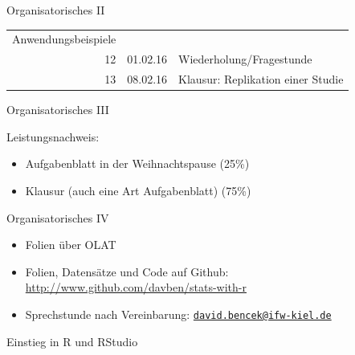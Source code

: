 \documentclass[ignorenonframetext,]{beamer}
\begin{document}
\begin{frame}{Organisatorisches II}
\begin{longtable}[c]{@{}rll@{}}
\begin{minipage}[t]{0.58\columnwidth}\raggedright\strut
Anwendungsbeispiele
\strut\end{minipage}\tabularnewline
\begin{minipage}[t]{0.17\columnwidth}\raggedleft\strut
12
\strut\end{minipage} &
\begin{minipage}[t]{0.17\columnwidth}\raggedright\strut
01.02.16
\strut\end{minipage} &
\begin{minipage}[t]{0.58\columnwidth}\raggedright\strut
Wiederholung/Fragestunde
\strut\end{minipage}\tabularnewline
\begin{minipage}[t]{0.17\columnwidth}\raggedleft\strut
13
\strut\end{minipage} &
\begin{minipage}[t]{0.17\columnwidth}\raggedright\strut
08.02.16
\strut\end{minipage} &
\begin{minipage}[t]{0.58\columnwidth}\raggedright\strut
Klausur: Replikation einer Studie
\strut\end{minipage}\tabularnewline
\bottomrule
\end{longtable}

\end{frame}

\begin{frame}{Organisatorisches III}

\begin{block}{Leistungsnachweis:}

\begin{itemize}
\itemsep1pt\parskip0pt
\item
  Aufgabenblatt in der Weihnachtspause (25\%)
\item
  Klausur (auch eine Art Aufgabenblatt) (75\%)
\end{itemize}

\end{block}

\end{frame}

\begin{frame}{Organisatorisches IV}

\begin{itemize}
\item
  Folien über OLAT
\item
  Folien, Datensätze und Code auf Github:
  \href{http://www.github.com/davben/stats-with-r}{\url{http://www.github.com/davben/stats-with-r}}
\item
  Sprechstunde nach Vereinbarung:
  \href{mailto:david.bencek@ifw-kiel.de}{\nolinkurl{david.bencek@ifw-kiel.de}}
\end{itemize}

\end{frame}

\begin{frame}{Einstieg in R und RStudio}

\end{frame}
\end{document}
